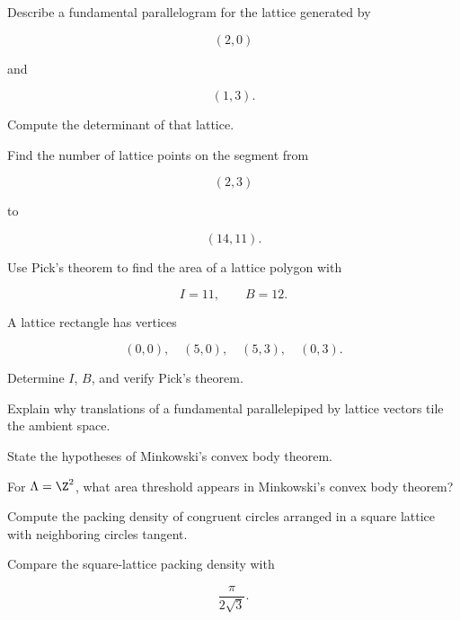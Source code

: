 \begin{exercise}[2]
Describe a fundamental parallelogram for the lattice generated by

\[
(2,0)
\]

and

\[
(1,3).
\]
\end{exercise}

\begin{exercise}[2]
Compute the determinant of that lattice.
\end{exercise}

\begin{exercise}[2]
Find the number of lattice points on the segment from

\[
(2,3)
\]

to

\[
(14,11).
\]
\end{exercise}

\begin{exercise}[2]
Use Pick's theorem to find the area of a lattice polygon with

\[
I=11,
\qquad
B=12.
\]
\end{exercise}

\begin{exercise}[2]
A lattice rectangle has vertices

\[
(0,0),\quad(5,0),\quad(5,3),\quad(0,3).
\]

Determine \(I\), \(B\), and verify Pick's theorem.
\end{exercise}

\begin{exercise}[2]
Explain why translations of a fundamental parallelepiped by lattice vectors
tile the ambient space.
\end{exercise}

\begin{exercise}[2]
State the hypotheses of Minkowski's convex body theorem.
\end{exercise}

\begin{exercise}[2]
For \(\Lambda=\Z^2\), what area threshold appears in Minkowski's convex body
theorem?
\end{exercise}

\begin{exercise}[2]
Compute the packing density of congruent circles arranged in a square
lattice with neighboring circles tangent.
\end{exercise}

\begin{exercise}[2]
Compare the square-lattice packing density with

\[
\frac{\pi}{2\sqrt3}.
\]
\end{exercise}

